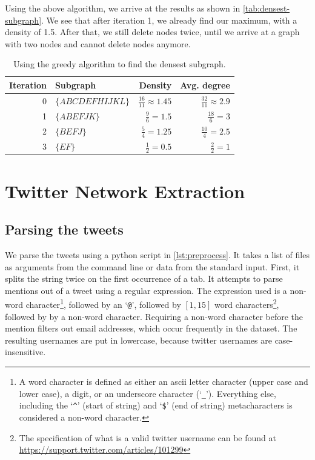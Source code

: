 \documentclass[a4paper,10pt,hidelinks]{article}
\begin{document}
Using the above algorithm, we arrive at the results as shown in \autoref{tab:densest-subgraph}. We see that after iteration 1, we already find our maximum, with a density of 1.5. After that, we still delete nodes twice, until we arrive at a graph with two nodes and cannot delete nodes anymore.

\begin{table}
    \centering
    \begin{tabular}{r || l | r | r}
        Iteration & Subgraph & Density & Avg. degree\\
        \hline
        0   & $\{A B C D E F H I J K L\}$ & $\frac{16}{11} \approx 1.45 $ & $\frac{32}{11} \approx 2.9 $ \\
        1   & $\{A B E F J K\}$ & $ \frac{9}{6} = 1.5 $ & $ \frac{18}{6} = 3 $ \\
        2   & $\{B E F J\}$ & $\frac{5}{4} = 1.25$ & $\frac{10}{4} = 2.5$ \\
        3   & $\{E F\}$ & $\frac{1}{2} = 0.5$ & $\frac{2}{2} = 1$
    \end{tabular}
    \caption{Using the greedy algorithm to find the densest subgraph.}
    \label{tab:densest-subgraph}
\end{table}

\section{Twitter Network Extraction}



\subsection{Parsing the tweets}

We parse the tweets using a python script in \autoref{lst:preprocess}. It takes a list of files as arguments from the command line or data from the standard input. First, it splits the string twice on the first occurrence of a tab. It attempts to parse mentions out of a tweet using a regular expression. The expression used is a non-word character\footnote{A word character is defined as either an ascii letter character (upper case and lower case), a digit, or an underscore character (`\texttt{\_}'). Everything else, including the `\texttt{\^}' (start of string) and `\texttt{\$}' (end of string) metacharacters is considered a non-word character.}, followed by an `\texttt{@}', followed by $[1, 15]$ word characters\footnote{The specification of what is a valid twitter username can be found at \url{https://support.twitter.com/articles/101299}}, followed by by a non-word character. Requiring a non-word character before the mention filters out email addresses, which occur frequently in the dataset. The resulting usernames are put in lowercase, because twitter usernames are case-insensitive.
\end{document}
